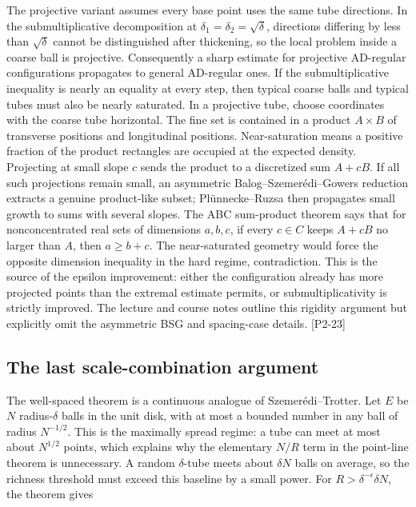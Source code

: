 The projective variant assumes every base point uses the same tube directions. In the submultiplicative decomposition at \(\delta_1=\delta_2=\sqrt\delta\), directions differing by less than \(\sqrt\delta\) cannot be distinguished after thickening, so the local problem inside a coarse ball is projective. Consequently a sharp estimate for projective AD-regular configurations propagates to general AD-regular ones. If the submultiplicative inequality is nearly an equality at every step, then typical coarse balls and typical tubes must also be nearly saturated. In a projective tube, choose coordinates with the coarse tube horizontal. The fine set is contained in a product \(A\times B\) of transverse positions and longitudinal positions. Near-saturation means a positive fraction of the product rectangles are occupied at the expected density. Projecting at small slope \(c\) sends the product to a discretized sum \(A+cB\). If all such projections remain small, an asymmetric Balog--Szemerédi--Gowers reduction extracts a genuine product-like subset; Plünnecke--Ruzsa then propagates small growth to sums with several slopes. The ABC sum-product theorem says that for nonconcentrated real sets of dimensions \(a,b,c\), if every \(c\in C\) keeps \(A+cB\) no larger than \(A\), then \(a\ge b+c\). The near-saturated geometry would force the opposite dimension inequality in the hard regime, contradiction. This is the source of the epsilon improvement: either the configuration already has more projected points than the extremal estimate permits, or submultiplicativity is strictly improved. The lecture and course notes outline this rigidity argument but explicitly omit the asymmetric BSG and spacing-case details. {[}P2-23{]}

\subsection{The last scale-combination argument}\label{04-visual-computing-ii-ch033-the-last-scale-combination-argument-1}

\hypertarget{04-visual-computing-ii-ch033-the-last-scale-combination-argument-1}{}

The well-spaced theorem is a continuous analogue of Szemerédi--Trotter. Let \(E\) be \(N\) radius-\(\delta\) balls in the unit disk, with at most a bounded number in any ball of radius \(N^{-1/2}\). This is the maximally spread regime: a tube can meet at most about \(N^{1/2}\) points, which explains why the elementary \(N/R\) term in the point-line theorem is unnecessary. A random \(\delta\)-tube meets about \(\delta N\) balls on average, so the richness threshold must exceed this baseline by a small power. For \(R>\delta^{-\epsilon}\delta N\), the theorem gives

